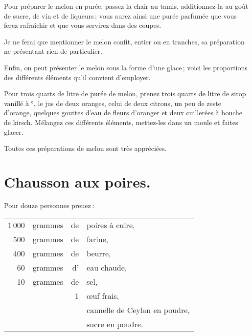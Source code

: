 \sk

Pour préparer le melon en purée, passez la chair au tamis, additionnez-la au
goût de sucre, de vin et de liqueurs : vous aurez ainsi une purée parfumée que
vous ferez rafraîchir et que vous servirez dans des coupes.

\sk

Je ne ferai que mentionner le melon confit, entier ou en tranches, sa
préparation ne présentant rien de particulier.

\sk

Enfin, on peut présenter le melon sous la forme d'une glace ; voici les
proportions des différents éléments qu'il convient d'employer.

Pour trois quarts de litre de purée de melon, prenez trois quarts de litre de
sirop vanillé à {\mmm}°, le jus de deux oranges, celui de deux citrons,
un peu de zeste d'orange, quelques gouttes d’eau de fleurs d'oranger et deux
cuillerées à bouche de kirsch. Mélangez ces différents éléments, mettez-les
dans un moule et faites glacer.

\medskip

Toutes ces préparations de melon sont très appréciées.

\section*{\centering Chausson aux poires.}
{}

Pour douze personnes prenez :

\footnotesize
\begin{longtable}{rrrp{16em}}
  1 000 & grammes & de & poires à cuire,                                                                  \\
    500 & grammes & de & farine,                                                                          \\
    400 & grammes & de & beurre,                                                                          \\
     60 & grammes & d' & eau chaude,                                                                      \\
     10 & grammes & de & sel,                                                                             \\
        &         &  1 & œuf frais,                                                                       \\
        &         &    & cannelle de Ceylan en poudre,                                                    \\
        &         &    & sucre en poudre.
\end{longtable}
\normalsize

